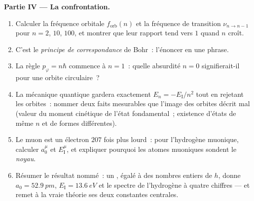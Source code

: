 \begin{problem}
\medskip\noindent\textbf{Partie IV --- La confrontation.}
\begin{enumerate}[resume]
  \item Calculer la fréquence orbitale $f_{\text{orb}}(n)$ et la
        fréquence de transition $\nu_{n \to n-1}$ pour $n = 2$, $10$,
        $100$, et montrer que leur rapport tend vers $1$ quand $n$ croît.
  \item C'est le \emph{principe de correspondance} de Bohr~: l'énoncer
        en une phrase.
  \item La règle $p_\varphi = n\hbar$ commence à $n = 1$~: quelle
        absurdité $n = 0$ signifierait-il pour une orbite circulaire~?
  \item La mécanique quantique gardera exactement $E_n = -E_{\text{I}}/n^2$
        tout en rejetant les orbites~: nommer deux faits mesurables que
        l'image des orbites décrit mal (valeur du moment cinétique de
        l'état fondamental~; existence d'états de même $n$ et de formes
        différentes).
  \item Le muon est un électron $207$ fois plus lourd~: pour
        l'hydrogène muonique, calculer $a_0^\mu$ et $E_{\text{I}}^\mu$,
        et expliquer pourquoi les atomes muoniques sondent le
        \emph{noyau}.
  \item Résumer le résultat nommé~: un , égalé à
        des nombres entiers de $h$, donne $a_0 = \qty{52.9}{pm}$,
        $E_{\text{I}} = \qty{13.6}{eV}$ et le spectre de l'hydrogène à
        quatre chiffres --- et remet à la vraie théorie ses deux
        constantes centrales.
\end{enumerate}
\end{problem}
